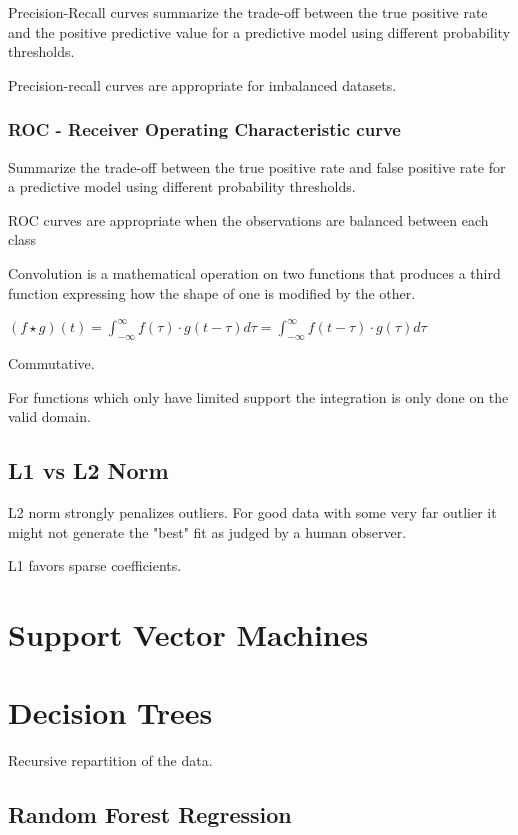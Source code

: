 Precision-Recall curves summarize the trade-off between the true positive rate and the positive predictive value for a predictive model using different probability thresholds.

Precision-recall curves are appropriate for imbalanced datasets.

\subsubsection{ROC -  Receiver Operating Characteristic curve}

Summarize the trade-off between the true positive rate and false positive rate for a predictive model using different probability thresholds.

ROC curves are appropriate when the observations are balanced between each class

Convolution is a mathematical operation on two functions that produces a third function expressing how the shape of one is modified by the other.

$(f\star g)(t) = \int_{-\infty}^{\infty} f(\tau)\cdot g(t-\tau)d\tau = \int_{-\infty}^{\infty} f(t-\tau)\cdot g(\tau)d\tau $

Commutative. 

For functions which only have limited support the integration is only done on the valid domain.

\subsection{L1 vs L2 Norm}

L2 norm strongly penalizes outliers. For good data with some very far outlier it might not generate the "best" fit as judged by a human observer.

L1 favors sparse coefficients.



\section{Support Vector Machines}

\section{Decision Trees}
Recursive repartition of the data. 

\subsection{Random Forest Regression}

